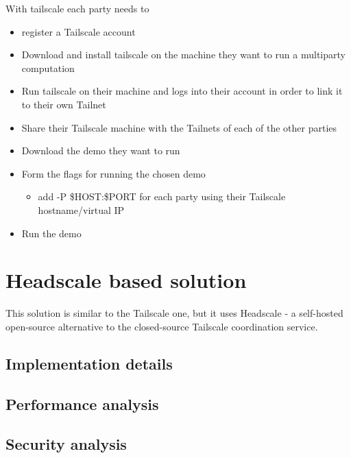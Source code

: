 With tailscale each party needs to

\begin{itemize}
\tightlist
\item
  register a Tailscale account
\item
  Download and install tailscale on the machine they want to run a multiparty computation
\item
  Run tailscale on their machine and logs into their account in order to link it to their own Tailnet
\item
  Share their Tailscale machine with the Tailnets of each of the other parties
\item
  Download the demo they want to run
\item
  Form the flags for running the chosen demo

  \begin{itemize}
  \tightlist
  \item
    add -P \$HOST:\$PORT for each party using their Tailscale hostname/virtual IP
  \end{itemize}
\item
  Run the demo
\end{itemize}

\label{thesis__080-headscale.md}
\chapter{Headscale based solution}\label{thesis__080-headscale.md__headscale-based-solution}

This solution is similar to the Tailscale one, but it uses Headscale - a self-hosted open-source alternative to the closed-source Tailscale coordination service.

\section{Implementation details}\label{thesis__080-headscale.md__implementation-details}

\section{Performance analysis}\label{thesis__080-headscale.md__performance-analysis}

\section{Security analysis}\label{thesis__080-headscale.md__security-analysis}

